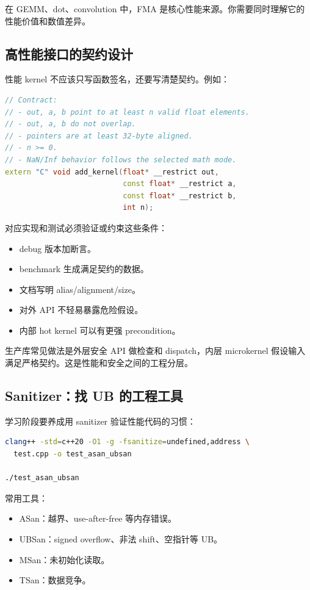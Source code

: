 在 GEMM、dot、convolution 中，FMA 是核心性能来源。你需要同时理解它的性能价值和数值差异。

\subsection{高性能接口的契约设计}

性能 kernel 不应该只写函数签名，还要写清楚契约。例如：

\begin{lstlisting}[language=C++]
// Contract:
// - out, a, b point to at least n valid float elements.
// - out, a, b do not overlap.
// - pointers are at least 32-byte aligned.
// - n >= 0.
// - NaN/Inf behavior follows the selected math mode.
extern "C" void add_kernel(float* __restrict out,
                           const float* __restrict a,
                           const float* __restrict b,
                           int n);
\end{lstlisting}

对应实现和测试必须验证或约束这些条件：

\begin{itemize}
  \item debug 版本加断言。
  \item benchmark 生成满足契约的数据。
  \item 文档写明 alias/alignment/size。
  \item 对外 API 不轻易暴露危险假设。
  \item 内部 hot kernel 可以有更强 precondition。
\end{itemize}

生产库常见做法是外层安全 API 做检查和 dispatch，内层 microkernel 假设输入满足严格契约。这是性能和安全之间的工程分层。

\subsection{Sanitizer：找 UB 的工程工具}

学习阶段要养成用 sanitizer 验证性能代码的习惯：

\begin{lstlisting}[language=bash]
clang++ -std=c++20 -O1 -g -fsanitize=undefined,address \
  test.cpp -o test_asan_ubsan

./test_asan_ubsan
\end{lstlisting}

常用工具：

\begin{itemize}
  \item ASan：越界、use-after-free 等内存错误。
  \item UBSan：signed overflow、非法 shift、空指针等 UB。
  \item MSan：未初始化读取。
  \item TSan：数据竞争。
\end{itemize}

